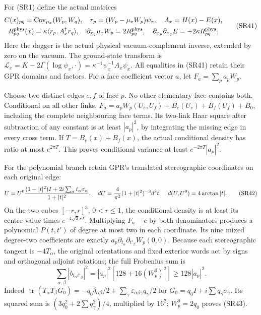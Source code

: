 \documentclass[11pt]{article}
\begin{document}
For (SR1) define the actual matrices
\[
\begin{gathered}
C(x)_{pq}=\operatorname{Cov}_{\mu_x}(W_p,W_q),\quad
r_p=(W_p-\mu_xW_p)\psi_x,\quad A_x=H(x)-E(x),\\
R^{\rm phys}_{pq}(x)=\kappa\langle r_p,A_x^\dagger r_q\rangle,\quad
\partial_{x_q}\mu_xW_p=2R^{\rm phys}_{pq},\quad
\partial_{x_p}\partial_{x_q}E=-2\kappa R^{\rm phys}_{pq}.
\end{gathered}\tag{SR41}
\]
Here the dagger is the actual physical vacuum-complement inverse, extended by zero on the vacuum. The ground-state transform is \(\mathcal L_x=K-2\Gamma(\log\psi_x,\cdot)=\kappa^{-1}\psi_x^{-1}A_x\psi_x\). All equalities in (SR41) retain their GPR domains and factors. For a face coefficient vector \(a\), let \(F_a=\sum_pa_pW_p\).

Choose two distinct edges \(e,f\) of face \(p\). No other elementary face contains both. Conditional on all other links,
\(F_a=a_pW_p(U_e,U_f)+B_e(U_e)+B_f(U_f)+B_0\),
including the complete neighbouring face terms. Its two-link Haar square after subtraction of any constant is at least \(|a_p|^2\), by integrating the missing edge in every cross term. If \(T=B_e(x)+B_f(x)\), the actual conditional density has ratio at most \(e^{2\pi T}\). This proves conditional variance at least \(e^{-2\pi T}|a_p|^2\).

For the polynomial branch retain GPR's translated stereographic coordinates on each original edge:
\[
U=U^0{(1-|t|^2)I+2i\sum_\alpha t_\alpha\sigma_\alpha\over1+|t|^2},\quad
dU={4\over\pi^2}(1+|t|^2)^{-3}d^3t,\quad d(U,U^0)=4\arctan|t|.
\tag{SR42}
\]
On the two cubes \([-r,r]^3\), \(0<r\le1\), the conditional density is at least its centre value times \(e^{-4\sqrt3rT}\). Multiplying \(F_a-c\) by both denominators produces a polynomial \(P(t,t')\) of degree at most two in each coordinate. Its nine mixed degree-two coefficients are exactly \(a_p\partial_{t_\alpha}\partial_{t'_\beta}W_p(0,0)\). Because each stereographic tangent is \(-4T_\alpha\), the original orientations and fixed exterior words act by signs and orthogonal adjoint rotations; the full Frobenius sum is
\[
\sum_{\alpha,\beta}|b_{t_\alpha t'_\beta}|^2
=|a_p|^2[128+16(W_p^0)^2]\ge128|a_p|^2.
\tag{SR43}
\]
Indeed \(\operatorname{tr}(T_\alpha T_\beta G_0)=-q_0\delta_{\alpha\beta}/2+\sum_\gamma\varepsilon_{\alpha\beta\gamma}q_\gamma/2\) for \(G_0=q_0I+i\sum q_\gamma\sigma_\gamma\). Its squared sum is \((3q_0^2+2\sum q_\gamma^2)/4\), multiplied by \(16^2\); \(W_p^0=2q_0\) proves (SR43).
\end{document}

